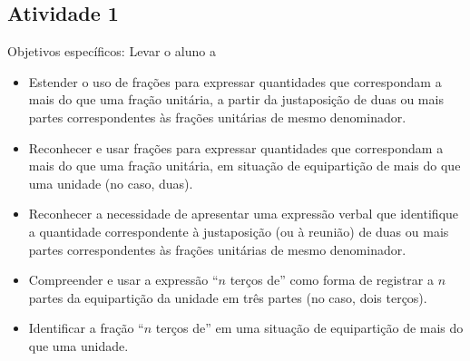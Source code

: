 \documentclass[oneside]{book}
\begin{document}
\begin{multicols}{2}


\subsection{Atividade 1}





  Objetivos específicos: Levar o aluno a
\begin{itemize} %
    \item       Estender o uso de frações para expressar quantidades que correspondam a mais do que uma fração unitária, a partir da justaposição de duas ou mais partes correspondentes às frações unitárias de mesmo denominador.
    \item       Reconhecer e usar frações para expressar quantidades que correspondam a mais do que uma fração unitária, em situação de equipartição de mais do que uma unidade (no caso, duas).
    \item       Reconhecer a necessidade de apresentar uma expressão verbal que identifique a quantidade correspondente à justaposição (ou à reunião) de duas ou mais partes correspondentes às frações unitárias de mesmo denominador.
    \item       Compreender e usar a expressão       ``$n$ terços de''       como forma de registrar a       $n$       partes da equipartição da unidade em três partes (no caso, dois terços).
    \item       Identificar a fração       ``$n$ terços de''       em uma situação de equipartição de mais do que uma unidade.
\end{itemize} %



\end{multicols}
\end{document}
